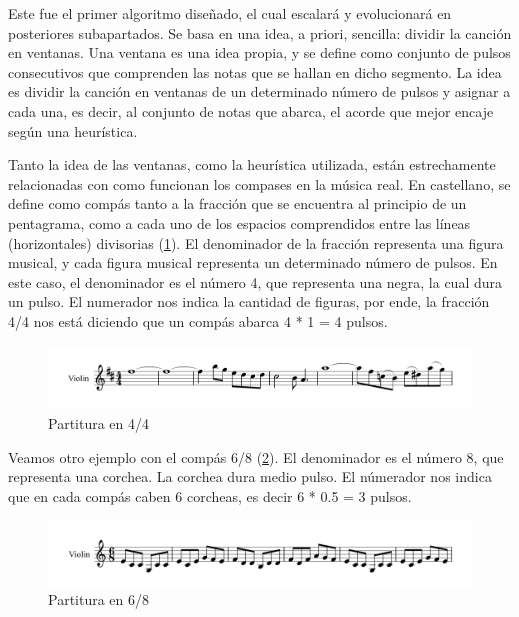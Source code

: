     Este fue el primer algoritmo diseñado, el cual escalará y evolucionará en posteriores subapartados. Se basa en una idea, a priori, sencilla: dividir la canción en ventanas. Una ventana es una idea propia, y se define como conjunto de pulsos consecutivos que comprenden las notas que se hallan en dicho segmento. La idea es dividir la canción en ventanas de un determinado número de pulsos y asignar a cada una, es decir, al conjunto de notas que abarca, el acorde que mejor encaje según una heurística.

    Tanto la idea de las ventanas, como la heurística utilizada, están estrechamente relacionadas con como funcionan los compases en la música real. En castellano, se define como compás tanto a la fracción que se encuentra al principio de un pentagrama, como a cada uno de los espacios comprendidos entre las líneas (horizontales) divisorias (\ref{fig:sheet4/4}). El denominador de la fracción representa una figura musical, y cada figura musical representa un determinado número de pulsos. En este caso, el denominador es el número 4, que representa una negra, la cual dura un pulso. El numerador nos indica la cantidad de figuras, por ende, la fracción 4/4 nos está diciendo que un compás abarca 4 * 1 = 4 pulsos. 

\begin{figure}[h]
    \begin{center}
        \includegraphics[scale=0.65]{Imagenes/Bitmap/partitura.png}
    \end{center}
    \caption{Partitura en 4/4}
    \label{fig:sheet4/4}
\end{figure}

    Veamos otro ejemplo con el compás 6/8 (\ref{fig:sheet6/8}). El denominador es el número 8, que representa una corchea. La corchea dura medio pulso. El númerador nos indica que en cada compás caben 6 corcheas, es decir 6 * 0.5 = 3 pulsos.

\begin{figure}[h]
    \begin{center}
        \includegraphics[scale=0.65]{Imagenes/Bitmap/partitura2.png}
    \end{center}
    \caption{Partitura en 6/8}
    \label{fig:sheet6/8}
\end{figure}

